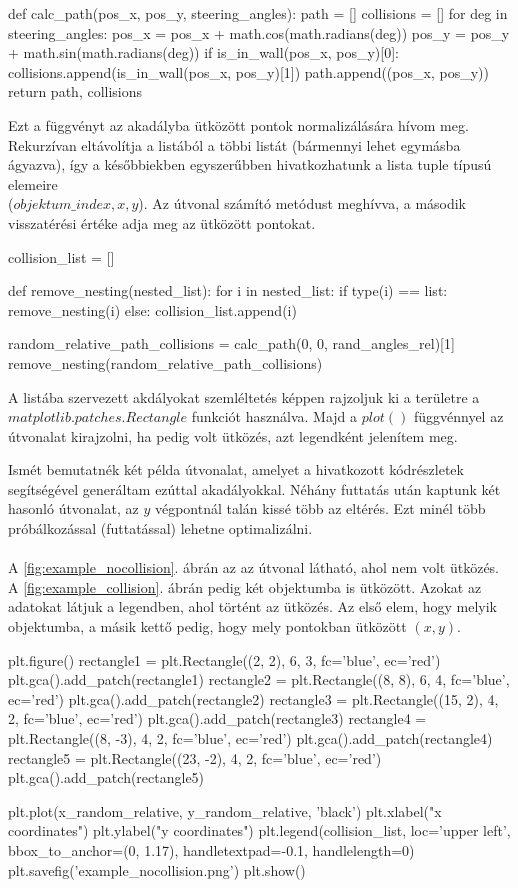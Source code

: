 \begin{python}
def calc_path(pos_x, pos_y, steering_angles):
    path = []
    collisions = []
    for deg in steering_angles:
        pos_x = pos_x + math.cos(math.radians(deg))
        pos_y = pos_y + math.sin(math.radians(deg))
        if is_in_wall(pos_x, pos_y)[0]:
            collisions.append(is_in_wall(pos_x, pos_y)[1])
        path.append((pos_x, pos_y))
    return path, collisions
\end{python}
Ezt a függvényt az akadályba ütközött pontok normalizálására hívom meg. Rekurzívan eltávolítja a listából a többi listát (bármennyi lehet egymásba ágyazva), így a későbbiekben egyszerűbben hivatkozhatunk a lista tuple típusú elemeire\\
($objektum\_index, x, y$). Az útvonal számító metódust meghívva, a második visszatérési értéke adja meg az ütközött pontokat.
\begin{python}
collision_list = []

def remove_nesting(nested_list):
    for i in nested_list:
        if type(i) == list:
            remove_nesting(i)
        else:
            collision_list.append(i)
            
random_relative_path_collisions = calc_path(0, 0, rand_angles_rel)[1]            
remove_nesting(random_relative_path_collisions)
\end{python}
A listába szervezett akdályokat szemléltetés képpen rajzoljuk ki a területre a \\
$ matplotlib.patches.Rectangle $ funkciót használva. Majd a $ plot() $ függvénnyel az útvonalat kirajzolni, ha pedig volt ütközés, azt legendként jelenítem meg.

Ismét bemutatnék két példa útvonalat, amelyet a hivatkozott kódrészletek segítségével generáltam ezúttal akadályokkal. Néhány futtatás után kaptunk két hasonló útvonalat, az $ y $ végpontnál talán kissé több az eltérés. Ezt minél több próbálkozással (futtatással) lehetne optimalizálni. \\\\
A \ref{fig:example_nocollision}. ábrán az az útvonal látható, ahol nem volt ütközés. A \ref{fig:example_collision}. ábrán pedig két objektumba is ütközött. Azokat az adatokat látjuk a legendben, ahol történt az ütközés. Az első elem, hogy melyik objektumba, a másik kettő pedig, hogy mely pontokban ütközött $ (x, y) $.
\begin{python}
plt.figure()
rectangle1 = plt.Rectangle((2, 2), 6, 3, fc='blue', ec='red')
plt.gca().add_patch(rectangle1)
rectangle2 = plt.Rectangle((8, 8), 6, 4, fc='blue', ec='red')
plt.gca().add_patch(rectangle2)
rectangle3 = plt.Rectangle((15, 2), 4, 2, fc='blue', ec='red')
plt.gca().add_patch(rectangle3)
rectangle4 = plt.Rectangle((8, -3), 4, 2, fc='blue', ec='red')
plt.gca().add_patch(rectangle4)
rectangle5 = plt.Rectangle((23, -2), 4, 2, fc='blue', ec='red')
plt.gca().add_patch(rectangle5)

plt.plot(x_random_relative, y_random_relative, 'black')
plt.xlabel("x coordinates")
plt.ylabel("y coordinates")
plt.legend(collision_list, loc='upper left', bbox_to_anchor=(0, 1.17),
handletextpad=-0.1, handlelength=0)
plt.savefig('example_nocollision.png')
plt.show()
\end{python}

